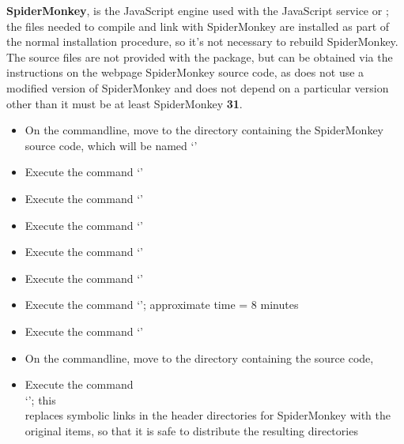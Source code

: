 \TBD{}
\tertiaryEnd{}
\TBD{}
\tertiaryEnd{}
\secondaryEnd{}
\textbf{SpiderMonkey}, is the JavaScript engine used with the JavaScript service or
\mplusm{}; the files needed to compile and link with SpiderMonkey are installed as part of
the normal \mplusm{} installation procedure, so it's not necessary to rebuild
SpiderMonkey.
The source files are not provided with the  package, but can be obtained
via the instructions on the web\longDash{}page
%
{SpiderMonkey source code}, as \mplusm{} does not use a modified version of SpiderMonkey
and does not depend on a particular version \longDash{} other than it must be at least
SpiderMonkey \textbf{31}.
\begin{itemize}
\item On the command\longDash{}line, move to the directory containing the SpiderMonkey
source code, which will be named `'
\item\exSp{} Execute the command `'
\item\exSp{} Execute the command `'
\item\exSp{} Execute the command `'
\item\exSp{} Execute the command `'
\item\exSp{} Execute the command `'
\item\exSp{} Execute the command `'; approximate time = 8
minutes
\item\exSp{} Execute the command `'
\item\exSp{} On the command\longDash{}line, move to the directory containing the \mplusm{}
source code, 
\item\exSp{} Execute the command\\
`';
this\\
replaces symbolic links in the header directories for SpiderMonkey with the original
items, so that it is safe to distribute the resulting directories
\end{itemize}
